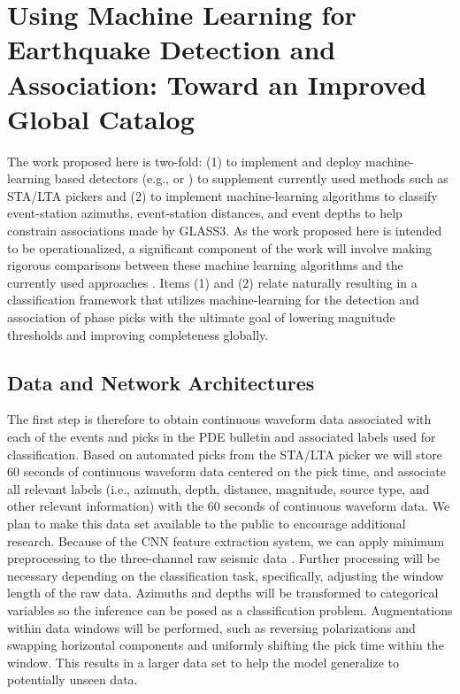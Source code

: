 \documentclass[12p]{article}
\begin{document}
\section{Using Machine Learning for Earthquake Detection and Association: Toward an Improved Global Catalog}

The work proposed here is two-fold: (1) to implement and deploy machine-learning based detectors (e.g.,
\citet{Perol2018} or \citet{Ross2018a}) to supplement currently used methods such as STA/LTA pickers and (2) to
implement machine-learning algorithms to classify event-station azimuths, event-station distances, and event depths to
help constrain associations made by GLASS3. As the work proposed here is intended to be operationalized, a significant
component of the work will involve making rigorous comparisons between these machine learning algorithms and the
currently used approaches \citep{Patton2016, Yeck2019}. Items (1) and (2) relate naturally resulting in a classification
framework that utilizes machine-learning for the detection and association of phase picks with the ultimate goal of
lowering magnitude thresholds and improving completeness globally.

\subsection{Data and Network Architectures}

The first step is therefore to obtain continuous waveform data associated with each of the events and picks in the PDE
bulletin and associated labels used for classification. Based on automated picks from the STA/LTA picker we will store
60 seconds of continuous waveform data centered on the pick time, and associate all relevant labels (i.e., azimuth,
depth, distance, magnitude, source type, and other relevant information) with the 60 seconds of continuous waveform data. We plan to make this data set available to the public to encourage additional research. Because of the CNN feature
extraction system, we can apply minimum preprocessing to the three-channel raw seismic data \citep{Ross2018b}.
Further processing will be necessary depending on the classification task, specifically, adjusting the window length of
the raw data. Azimuths and depths will be transformed to categorical variables so the inference can be posed as a
classification problem. Augmentations within data windows will be performed, such as reversing polarizations and
swapping horizontal components and uniformly shifting the pick time within the window. This results in a larger data set
to help the model generalize to potentially unseen data.
\end{document}
